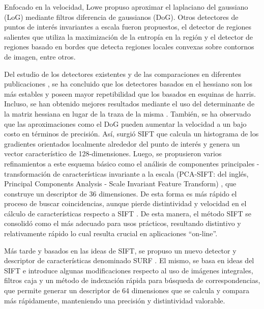 Enfocado en la velocidad, Lowe \cite{Lowe1999} propuso aproximar el laplaciano del gaussiano (LoG) mediante filtros diferencia de gaussianos (DoG). Otros detectores de puntos de interés invariantes a escala fueron propuestos, el detector de regiones salientes \cite{journals/ijcv/KadirB01} que utiliza la maximización de la entropía en la región y el detector de regiones basado en bordes \cite{conf/cvpr/JurieS04} que detecta regiones locales convexas sobre contornos de imagen, entre otros.

Del estudio de los detectores existentes y de las comparaciones en diferentes publicaciones \cite{journals/ijcv/MikolajczykS04, bb53077}, se ha concluido que los detectores basados en el hessiano son los más estables y poseen mayor repetibilidad que los basados en esquinas de harris. Incluso, se han obtenido mejores resultados mediante el uso del determinante de la matriz hessiana en lugar de la traza de la misma \cite{journals/ijcv/MikolajczykS04}. También, se ha observado que las aproximaciones como el DoG pueden aumentar la velocidad a un bajo costo en términos de precisión. Así, surgió SIFT \cite{Lowe:2004:DIF:993451.996342} que calcula un histograma de los gradientes orientados localmente alrededor del punto de interés y genera un vector característico de 128-dimensiones. Luego, se propusieron varios refinamientos a este esquema básico como el análisis de componentes principales - transformación de características invariante a la escala (PCA-SIFT: del inglés, Principal Components Analysis - Scale Invariant Feature Transform) \cite{citeulike:3484001}, \cite{bb53077} que construye un descriptor de 36 dimensiones. De esta forma es más rápido el proceso de buscar coincidencias, aunque pierde distintividad y velocidad en el cálculo de características respecto a SIFT \cite{Mikolajczyk:2005:PEL:1083822.1083989}. De esta manera, el método SIFT se consolidó como el más adecuado para usos prácticos, resultando distintivo y relativamente rápido lo cual resulta crucial en aplicaciones ``on-line''.

Más tarde y basados en las ideas de SIFT, se propuso un nuevo detector y descriptor de características denominado SURF \cite{Bay06surf:speeded, Bay:2008:SRF}. El mismo, se basa en ideas del SIFT e introduce algunas modificaciones respecto al uso de imágenes integrales, filtros caja y un método de indexación rápida para búsqueda de correspondencias, que permite generar un descriptor de 64 dimensiones que se calcula y compara más rápidamente, manteniendo una precisión y distintividad valorable.

